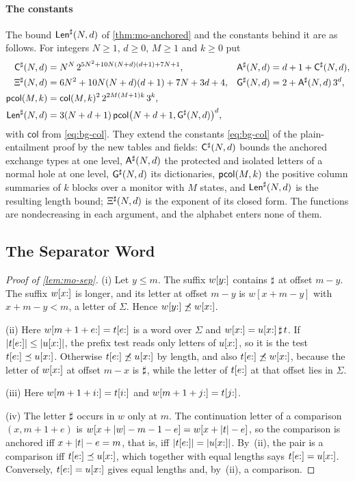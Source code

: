 \paragraph{The constants}
The bound $\mathsf{Len}^{\sharp}(N,d)$ of \cref{thm:mo-anchored} and the constants behind
it are as follows. For integers $N\ge1$, $d\ge0$, $M\ge1$ and $k\ge0$ put
\begin{equation}\label{eq:mo-constants}
\begin{aligned}
 \mathsf{C}^{\sharp}(N,d)&=N^N\,2^{5N^2+10N(N+d)(d+1)+7N+1},&
 \mathsf{A}^{\sharp}(N,d)&=d+1+\mathsf{C}^{\sharp}(N,d),\\
 \Xi^{\sharp}(N,d)&=6N^2+10N(N+d)(d+1)+7N+3d+4,&
 \mathsf{G}^{\sharp}(N,d)&=2+\mathsf{A}^{\sharp}(N,d)\,3^d,\\
 \mathsf{pcol}(M,k)&=\mathsf{col}(M,k)^2\,2^{2M(M+1)k}\,3^k,\\
 \mathsf{Len}^{\sharp}(N,d)&=3(N+d+1)\,\mathsf{pcol}\bigl(N+d+1,\mathsf{G}^{\sharp}(N,d)\bigr)^d,
\end{aligned}
\end{equation}
with $\mathsf{col}$ from \cref{eq:bg-col}. They extend the constants
\cref{eq:bg-col} of the plain-entailment proof by the new tables and fields:
$\mathsf{C}^{\sharp}(N,d)$ bounds the anchored exchange types at one level,
$\mathsf{A}^{\sharp}(N,d)$ the protected and isolated letters of a normal hole at one
level, $\mathsf{G}^{\sharp}(N,d)$ its dictionaries, $\mathsf{pcol}(M,k)$ the positive column
summaries of $k$ blocks over a monitor with $M$ states, and $\mathsf{Len}^{\sharp}(N,d)$ is
the resulting length bound; $\Xi^{\sharp}(N,d)$ is the exponent of its closed form.
The functions are nondecreasing in each argument, and the alphabet enters none
of them.

\subsection{The Separator Word}\label{app:mo-separator}

\begin{proof}[Proof of \cref{lem:mo-sep}]
(i) Let $y\le m$. The suffix $w[y{:}]$ contains $\sharp$ at offset $m-y$. The
suffix $w[x{:}]$ is longer, and its letter at offset $m-y$ is $w[x+m-y]$ with
$x+m-y<m$, a letter of $\Sigma$. Hence $w[y{:}]\not\preceq w[x{:}]$.

(ii) Here $w[m+1+e{:}]=t[e{:}]$ is a word over $\Sigma$ and
$w[x{:}]=u[x{:}]\,\sharp\,t$. If $\lvert t[e{:}]\rvert\le\lvert u[x{:}]\rvert$, the prefix
test reads only letters of $u[x{:}]$, so it is the test
$t[e{:}]\preceq u[x{:}]$. Otherwise $t[e{:}]\not\preceq u[x{:}]$ by length, and also
$t[e{:}]\not\preceq w[x{:}]$, because the letter of $w[x{:}]$ at offset $m-x$ is
$\sharp$, while the letter of $t[e{:}]$ at that offset lies in $\Sigma$.

(iii) Here $w[m+1+i{:}]=t[i{:}]$ and $w[m+1+j{:}]=t[j{:}]$.

(iv) The letter $\sharp$ occurs in $w$ only at $m$. The continuation letter of a
comparison $(x,m+1+e)$ is $w[x+\lvert w\rvert-m-1-e]=w[x+\lvert t\rvert-e]$, so the comparison
is anchored iff $x+\lvert t\rvert-e=m$, that is, iff $\lvert t[e{:}]\rvert=\lvert u[x{:}]\rvert$.
By~(ii), the pair is a comparison iff $t[e{:}]\preceq u[x{:}]$, which together
with equal lengths says $t[e{:}]=u[x{:}]$. Conversely, $t[e{:}]=u[x{:}]$
gives equal lengths and, by~(ii), a comparison.
\end{proof}

